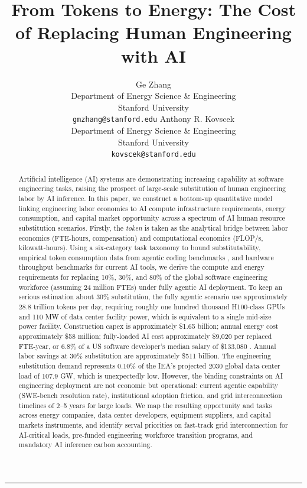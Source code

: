 \documentclass{article}
\title{%
  \textbf{From Tokens to Energy: The Cost of Replacing Human Engineering with AI}
}
\author{%
  Ge Zhang \\
  Department of Energy Science \& Engineering \\
  Stanford University \\
  \texttt{gmzhang@stanford.edu}
  \And
  Anthony R. Kovscek \\
  Department of Energy Science \& Engineering \\
  Stanford University \\
  \texttt{kovscek@stanford.edu}
}
\date{}
\newcommand{\PRIMARY}{\textbf{[PRIMARY]}}
\newcommand{\SECONDARY}{\textbf{[SECONDARY]}}
\newcommand{\ESTIMATE}{\textbf{[ESTIMATE]}}
\newcommand{\VERIFY}{\textcolor{red}{\textbf{[VERIFY]}}}
\begin{document}
\maketitle


\vspace{1em}
\hrule
\vspace{1em}

\begin{abstract}
Artificial intelligence (AI) systems are demonstrating increasing capability at software engineering tasks, raising the prospect of large-scale substitution of human engineering labor by AI inference. In this paper, we construct a bottom-up quantitative model linking engineering labor economics to AI compute infrastructure requirements, energy consumption, and capital market opportunity across a spectrum of AI human resource substitution scenarios. Firstly, the \emph{token} is taken as the analytical bridge between labor economics (FTE-hours, compensation) and computational economics (FLOP/s, kilowatt-hours). Using a six-category task taxonomy to bound substitutability, empirical token consumption data from agentic coding benchmarks \citep{bai2026agent}, and hardware throughput benchmarks for current AI tools, we derive the compute and energy requirements for replacing 10\%, 30\%, and 80\% of the global software engineering workforce (assuming 24 million FTEs) under fully agentic AI deployment. To keep an serious estimation about 30\% substitution, the fully agentic scenario use approximately 28.8 trillion tokens per day, requiring roughly one hundred thousand H100-class GPUs and 110 MW of data center facility power, which is equivalent to a single mid-size power facility. Construction capex is approximately \$1.65 billion; annual energy cost approximately \$58 million; fully-loaded AI cost approximately \$9,020 per replaced FTE-year, or 6.8\% of a US software developer's median salary of \$133,080 \citep{bls2024oes}. Annual labor savings at 30\% substitution are approximately \$511 billion. The engineering substitution demand represents 0.10\% of the IEA's projected 2030 global data center load of 107.9 GW, which is unexpectedly low. However, the binding constraints on AI engineering deployment are not economic but operational: current agentic capability (SWE-bench resolution rate), institutional adoption friction, and grid interconnection timelines of 2--5 years for large loads. We map the resulting opportunity and tasks across energy companies, data center developers, equipment suppliers, and capital markets instruments, and identify serval priorities on fast-track grid interconnection for AI-critical loads, pre-funded engineering workforce transition programs, and mandatory AI inference carbon accounting.




\end{abstract}
\end{document}
